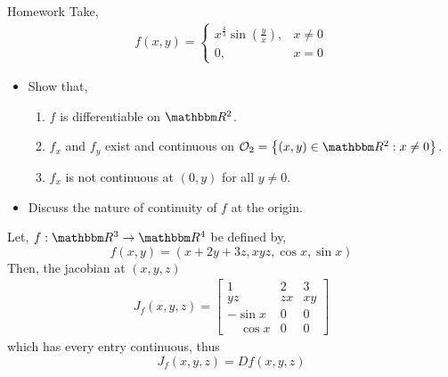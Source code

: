 \documentclass[../Analysis-3]{subfiles}
\begin{document}
\begin{Eg}{Homework}{}
  Take, \begin{align*}
    f(x,y) = \begin{cases}
               x^{\frac{4}{3}}\sin{\left( \frac{y}{x} \right)}, & x \not= 0 \\
               0,                                               & x = 0
             \end{cases}
  \end{align*}
  \begin{itemize}
    \item Show that, \begin{enumerate}
            \item $ f $ is differentiable on $ \R^2 $.
            \item $ f_x $ and $ f_y $ exist and continuous on $ \Op{2} = \left\{ (x,y)\in\R^2 : x \not= 0 \right\} $.
            \item $ f_x $ is not continuous at $ (0,y) $ for all $ y \not= 0 $.
          \end{enumerate}
    \item Discuss the nature of continuity of $ f $ at the origin.
  \end{itemize}
\end{Eg}

\begin{Eg}{}{}
  Let, $ f:\R^3 \to \R^4 $ be defined by, \[ f(x,y) = \left( x+2y+3z, xyz, \cos{x}, \sin{x} \right) \]
  Then, the jacobian at $ (x,y,z) $  \begin{align*}
    J_{f}(x,y,z) = \begin{bmatrix}
                     1             & 2  & 3  \\
                     yz            & zx & xy \\
                     -\sin{x}      & 0  & 0  \\
                     \quad \cos{x} & 0  & 0
                   \end{bmatrix}
  \end{align*}
  which has every entry continuous, thus \[J_{f}(x,y,z) = Df(x,y,z)\]
\end{Eg}
\end{document}
